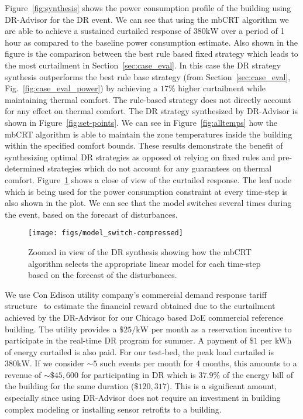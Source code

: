 \documentclass{sig-alternate-ipsn13}
\theoremstyle{definition}
\begin{document}
Figure~\ref{fig:synthesis} shows the power consumption profile of the building using DR-Advisor for the DR event. 
We can see that using the mbCRT algorithm we are able to achieve a sustained curtailed response of $380\si{\kilo\watt}$ over a period of 1 hour as compared to the baseline power consumption estimate.  Also shown in the figure is the comparison between the best rule based fixed strategy which leads to the most curtailment in Section~\ref{sec:case_eval}. In this case the DR strategy synthesis outperforms the best rule base strategy (from Section~\ref{sec:case_eval}, Fig.~\ref{fig:case_eval_power}) by achieving a $17\%$ higher curtailment while maintaining thermal comfort. The rule-based strategy does not directly account for any effect on thermal comfort.
The DR strategy synthesized by DR-Advisor is shown in Figure~\ref{fig:set-points}. 
We can see in Figure~\ref{fig:alltemps} how the mbCRT algorithm is able to maintain the zone temperatures inside the building within the specified comfort bounds.
These results demonstrate the benefit of synthesizing optimal DR strategies as opposed ot relying on fixed rules and pre-determined strategies which do not account for any guarantees on thermal comfort. 
Figure~\ref{fig:model-sel} shows a close of view of the curtailed response. The leaf node which is being used for the power consumption constraint at every time-step is also shown in the plot.
We can see that the model switches several times during the event, based on the forecast of disturbances. 

\begin{figure}
\texttt{[image: figs/model\_switch-compressed]}
\caption{Zoomed in view of the DR synthesis showing how the mbCRT algorithm selects the appropriate linear model for each time-step based on the forecast of the disturbances.}
\label{fig:model-sel}
\vspace{-10pt}
\end{figure}


We use Con Edison utility company's commercial demand response tariff structure~\cite{edison} to estimate the financial reward obtained due to the curtailment achieved by the DR-Advisor for our Chicago based DoE commercial reference building.
The utility provides a $\$25/\si{\kilo\watt}$ per month as a reservation incentive to participate in the real-time DR program for summer. A payment of $\$1$ per kWh of energy curtailed is also paid. For our test-bed, the peak load curtailed is $380\si{\kilo\watt}$. If we consider $\sim5$ such events per month for 4 months, this amounts to a revenue of $\sim \$45,600$ for participating in DR which is $37.9\%$ of the energy bill of the building for the same duration ($\$120,317$).
This is a significant amount, especially since using DR-Advisor does not require an investment in building complex modeling or installing sensor retrofits to a building.
\end{document}
